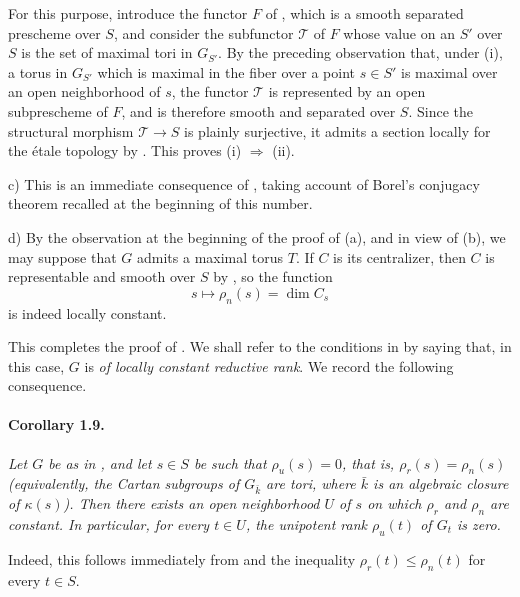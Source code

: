 For this purpose, introduce the functor \(F\) of ,
which is a smooth separated prescheme over \(S\), and consider the
subfunctor \(\mathcal T\) of \(F\) whose value on an \(S'\) over \(S\)
is the set of maximal tori in \(G_{S'}\). By the preceding observation
that, under (i), a torus in \(G_{S'}\) which is maximal in the fiber
over a point \(s\in S'\) is maximal over an open neighborhood of
\(s\), the functor \(\mathcal T\) is represented by an open
subprescheme of \(F\), and is therefore smooth and separated over
\(S\). Since the structural morphism \(\mathcal T\to S\) is plainly
surjective, it admits a section locally for the étale topology by
. This proves (i) \(\Rightarrow\) (ii).

c) This is an immediate consequence of , taking account of
Borel's conjugacy theorem recalled at the beginning of this number.

d) By the observation at the beginning of the proof of (a), and in
view of (b), we may suppose that \(G\) admits a maximal torus \(T\).
If \(C\) is its centralizer, then \(C\) is representable and smooth
over \(S\) by , so the function
\[
  s\longmapsto \rho_n(s)=\dim C_s
\]
is indeed locally constant.

This completes the proof of . We shall refer to the conditions in
 by saying that, in this case, \(G\) is \emph{of locally
constant reductive rank}. We record the following consequence.

\paragraph{\textbf{Corollary 1.9.}}
\emph{Let \(G\) be as in , and let \(s\in S\) be such that
\(\rho_u(s)=0\), that is,
\(\rho_r(s)=\rho_n(s)\) (equivalently, the Cartan subgroups of
\(G_{\bar k}\) are tori, where \(\bar k\) is an algebraic closure of
\(\kappa(s)\)). Then there exists an open neighborhood \(U\) of \(s\)
on which \(\rho_r\) and \(\rho_n\) are constant. In particular, for
every \(t\in U\), the unipotent rank \(\rho_u(t)\) of \(G_t\) is
zero.}

Indeed, this follows immediately from  and the inequality
\(\rho_r(t)\leq \rho_n(t)\) for every \(t\in S\).

